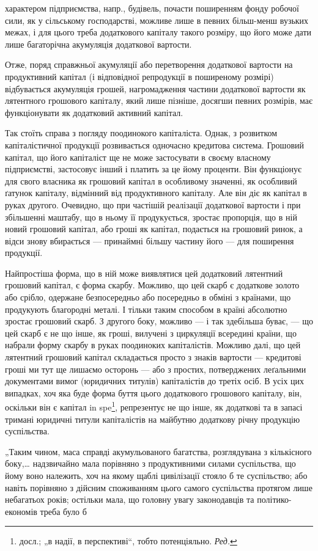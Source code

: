 \parcont{}  %
характером підприємства, напр., будівель, почасти поширенням фонду
робочої сили, як у сільському господарстві, можливе лише в певних
більш-менш вузьких межах, і для цього треба додаткового капіталу
такого розміру, що його може дати лише багаторічна акумуляція додаткової
вартости.

Отже, поряд справжньої акумуляції або перетворення додаткової
вартости на продуктивний капітал (і відповідної репродукції в поширеному
розмірі) відбувається акумуляція грошей, нагромадження частини додаткової
вартости як лятентного грошового капіталу, який лише пізніше,
досягши певних розмірів, має функціонувати як додатковий активний
капітал.

Так стоїть справа з погляду поодинокого капіталіста. Однак, з розвитком
капіталістичної продукції розвивається одночасно кредитова система.
Грошовий капітал, що його капіталіст ще не може застосувати в своєму
власному підприємстві, застосовує інший і платить за це йому проценти. Він
функціонує для свого власника як грошовий капітал в особливому
значенні, як особливий ґатунок капіталу, відмінний від продуктивного
капіталу. Але він діє як капітал в руках другого. Очевидно, що при
частішій реалізації додаткової вартости і при збільшенні маштабу, що
в ньому її продукується, зростає пропорція, що в ній новий грошовий
капітал, або гроші як капітал, подається на грошовий ринок, а відси
знову вбирається — принаймні більшу частину його — для поширення
продукції.

Найпростіша форма, що в ній може виявлятися цей додатковий лятентний
грошовий капітал, є форма скарбу. Можливо, що цей скарб є
додаткове золото або срібло, одержане безпосередньо або посередньо
в обміні з країнами, що продукують благородні металі. І тільки таким
способом в країні абсолютно зростає грошовий скарб. З другого боку,
можливо — і так здебільша буває, — що цей скарб є не що інше, як
гроші, вилучені з циркуляції всередині країни, що набрали форму скарбу
в руках поодиноких капіталістів. Можливо далі, що цей лятентний грошовий
капітал складається просто з знаків вартости — кредитові гроші
ми тут ще лишаємо осторонь — або з простих, потверджених леґальними
документами вимог (юридичних титулів) капіталістів до третіх осіб. В
усіх цих випадках, хоч яка буде форма буття цього додаткового грошового
капіталу, він, оскільки він є капітал in spe\footnote*{
досл.; „в надії, в перспективі“, тобто потенціяльно. \emph{Ред.}
}, репрезентує не
що інше, як додаткові та в запасі тримані юридичні титули капіталістів на
майбутню додаткову річну продукцію суспільства.

„Таким чином, маса справді акумульованого багатства, розглядувана
з кількісного боку,\dots{} надзвичайно мала порівняно з продуктивними
силами суспільства, що йому воно належить, хоч на якому щаблі цивілізації
стояло б те суспільство; або навіть порівняно з дійсним споживанням
цього самого суспільства протягом лише небагатьох років; остільки
мала, що головну увагу законодавців та політико-економів треба було б
\parbreak{}  %

